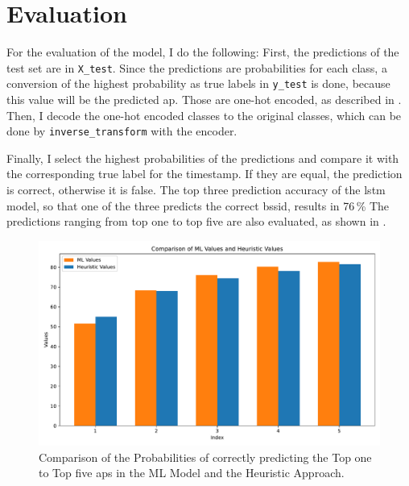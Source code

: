 \chapter{Evaluation}\label{ch:evaluation}

For the evaluation of the model, I do the following:
First, the predictions of the test set are in \texttt{X\_test}.
Since the predictions are probabilities for each class, a conversion of the highest probability as true labels in \texttt{y\_test} is done, because this value will be the predicted \ac{ap}.
Those are one-hot encoded, as described in .
Then, I decode the one-hot encoded classes to the original classes, which can be done by \texttt{inverse\_transform} with the encoder.

Finally, I select the highest probabilities of the predictions and compare it with the corresponding true label for the timestamp.
If they are equal, the prediction is correct, otherwise it is false.
The top three prediction accuracy of the \ac{lstm} model, so that one of the three predicts the correct \ac{bssid}, results in 76\,\% %
The predictions ranging from top one to top five are also evaluated, as shown in .

\begin{figure}[h]
    \centering
    \includegraphics*[scale=0.53]{images/comparison_ml_heuristic_1_to_5.pdf}
    \caption{Comparison of the Probabilities of correctly predicting the Top one to Top five \acp{ap} in the ML Model and the Heuristic Approach.}
    \label{fig:comparison_ml_heuristic_1_to_5}
\end{figure}

